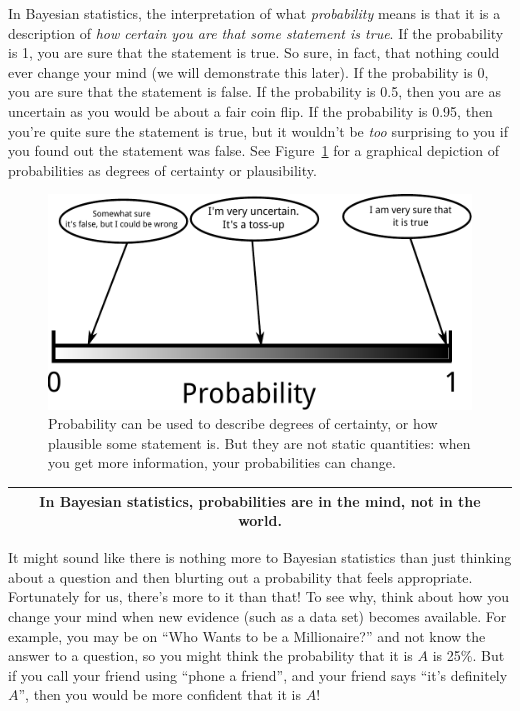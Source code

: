In Bayesian statistics, the interpretation of what {\it probability} means is
that it is a description of {\it how certain you are that some statement is
true}.
If the probability is 1, you are sure that the statement is true. So sure, in
fact, that nothing could ever change your mind (we will demonstrate this later).
If the probability is 0, you
are sure that the statement is false. If the probability is 0.5, then you
are as uncertain as you would be about a fair coin flip. If the probability is
0.95, then you're quite sure the statement is true, but it wouldn't be {\it too}
surprising to you if you found out the statement was false. See
Figure~\ref{fig:probability_scale} for a graphical depiction of probabilities
as degrees of certainty or plausibility.

\begin{figure}
\begin{center}
\includegraphics[scale=0.6]{Figures/probability_scale.pdf}
\caption{Probability can be used to describe degrees of certainty, or
how plausible some statement is. But they are not static quantities: when
you get more information, your probabilities can change.
\label{fig:probability_scale}}
\end{center}
\end{figure}

\begin{center}
\begin{tabular}{|c|}
\hline
{\bf In Bayesian statistics, probabilities are in the mind, not in the world.}\\
\hline
\end{tabular}
\end{center}

It might sound like there is nothing more to Bayesian statistics than just
thinking about a question and then blurting out a probability that feels
appropriate. Fortunately for us, there's more to it than that! To see why, think
about how you change your mind when new evidence (such as a data set) becomes
available. For example, you may be on ``Who Wants to be a Millionaire?'' and
not know the answer to a question, so you might think the probability that it is
$A$ is 25\%. But if you call your friend using ``phone a friend'', and
your friend says
``it's definitely $A$'', then you would be more confident that it is $A$!

